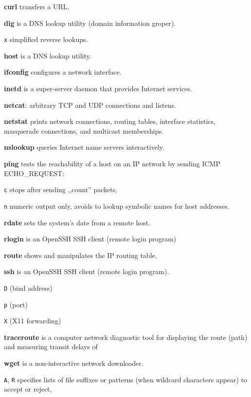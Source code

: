 \begin{enumx}
\item [\cmd] \textbf{curl} transfers a URL.
\item [\cmd] \textbf{dig} is a DNS lookup utility (domain information groper).
\item [\texttt{x}] simplified reverse lookups.
\item [\cmd] \textbf{host} is a DNS lookup utility.  
\item [\cmd] \textbf{ifconfig} configures a network interface.   
\item [\cmd] \textbf{inetd} is a super-server daemon that provides Internet services.
\item [\cmd] \textbf{netcat}: arbitrary TCP and UDP connections and listens.
\item [\cmd] \textbf{netstat} prints network connections, routing tables, 
interface statistics, masquerade connections, and multicast memberships.
\item [\cmd] \textbf{nslookup} queries Internet name servers interactively.
\item [\cmd] \textbf{ping} tests the reachability of a host 
on an IP network by sending ICMP ECHO\_REQUEST:
\item [\texttt{c}] stops after sending ,,count'' packets,
\item [\texttt{n}] numeric output only, 
	avoids to lookup symbolic names for host addresses. 
\item [\cmd] \textbf{rdate} sets the system's date from a remote host.
\item [\cmd] \textbf{rlogin} is an OpenSSH SSH client (remote login program)
\item [\cmd] \textbf{route} shows and manipulates the IP routing table.
\item [\cmd] \textbf{ssh} is an OpenSSH SSH client (remote login program).
\item [\texttt{D}] (bind address)
\item [\texttt{p}] (port)
\item [\texttt{X}] (X11 forwarding)
\item [\cmd] \textbf{traceroute} is a computer network diagnostic tool for 
displaying the route (path) and measuring transit delays of 
\item [\cmd] \textbf{wget} is a non-interactive network downloader.
\item [\texttt{A}, \texttt{R}] specifies lists 	of file suffixes or 
	patterns (when wildcard characters appear) to accept or reject,

\end{enumx}
